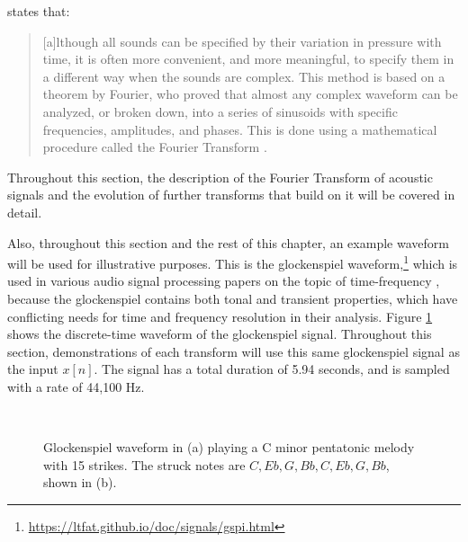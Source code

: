 \documentclass[report.tex]{subfiles}
\begin{document}
\citeauthor{moore} states that:

\begin{quote}
	[a]lthough all sounds can be specified by their variation in pressure with time, it is often more convenient, and more meaningful, to specify them in a different way when the sounds are complex. This method is based on a theorem by Fourier, who proved that almost any complex waveform can be analyzed, or broken down, into a series of sinusoids with specific frequencies, amplitudes, and phases. This is done using a mathematical procedure called the Fourier Transform \parencite[4]{moore}.
\end{quote}

Throughout this section, the description of the Fourier Transform of acoustic signals and the evolution of further transforms that build on it will be covered in detail.

Also, throughout this section and the rest of this chapter, an example waveform will be used for illustrative purposes. This is the glockenspiel waveform,\footnote{\url{https://ltfat.github.io/doc/signals/gspi.html}} which is used in various audio signal processing papers on the topic of time-frequency \parencite{doerflerphd, balazs, jaillet, tfjigsaw, invertiblecqt, wmdct}, because the glockenspiel contains both tonal and transient properties, which have conflicting needs for time and frequency resolution in their analysis. Figure \ref{fig:glockwaveform} shows the discrete-time waveform of the glockenspiel signal. Throughout this section, demonstrations of each transform will use this same glockenspiel signal as the input $x[n]$. The signal has a total duration of 5.94 seconds, and is sampled with a rate of 44,100 Hz.

\begin{figure}[ht]
	\centering
	\\
	\caption{Glockenspiel waveform in (a) playing a C minor pentatonic melody with 15 strikes. The struck notes are $C, Eb, G, Bb, C, Eb, G, Bb$, shown in (b).}
	\label{fig:glockwaveform}
\end{figure}
\end{document}
